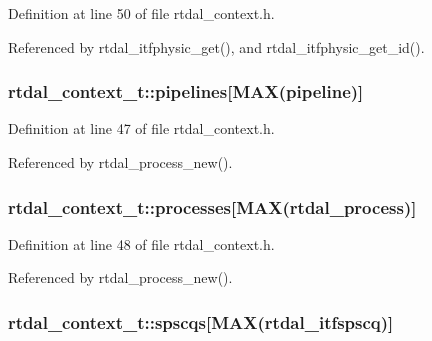 Definition at line 50 of file rtdal\-\_\-context.\-h.



Referenced by rtdal\-\_\-itfphysic\-\_\-get(), and rtdal\-\_\-itfphysic\-\_\-get\-\_\-id().

\hypertarget{structrtdal__context__t_a772193d8fa3cedd8888abc472dfe38de}{
\subsubsection[{pipelines}]{ rtdal\-\_\-context\-\_\-t\-::pipelines\mbox{[}{\bf M\-A\-X}(pipeline)\mbox{]}}}\label{structrtdal__context__t_a772193d8fa3cedd8888abc472dfe38de}


Definition at line 47 of file rtdal\-\_\-context.\-h.



Referenced by rtdal\-\_\-process\-\_\-new().

\hypertarget{structrtdal__context__t_a6b152d6315f1adb5fb53cd7005923ed8}{
\subsubsection[{processes}]{ rtdal\-\_\-context\-\_\-t\-::processes\mbox{[}{\bf M\-A\-X}(rtdal\-\_\-process)\mbox{]}}}\label{structrtdal__context__t_a6b152d6315f1adb5fb53cd7005923ed8}


Definition at line 48 of file rtdal\-\_\-context.\-h.



Referenced by rtdal\-\_\-process\-\_\-new().

\hypertarget{structrtdal__context__t_a089a2c82209dab33ed6b053fd455ddc6}{
\subsubsection[{spscqs}]{ rtdal\-\_\-context\-\_\-t\-::spscqs\mbox{[}{\bf M\-A\-X}(rtdal\-\_\-itfspscq)\mbox{]}}}\label{structrtdal__context__t_a089a2c82209dab33ed6b053fd455ddc6}


